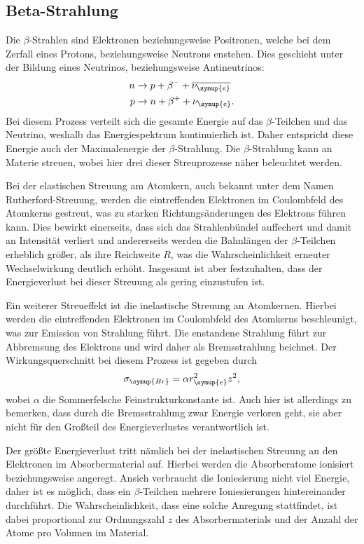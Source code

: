 \subsection{Beta-Strahlung}
Die $\beta$-Strahlen sind Elektronen beziehungsweise Positronen, welche bei dem Zerfall eines Protons, beziehungsweise Neutrons enstehen.
Dies geschieht unter der Bildung eines Neutrinos, beziehungsweise Antineutrinos:
\begin{align}
    \label{eqn:kernreaktionen}
    n &\to p + \beta^{-} + \overline{\nu_{\symup{e}}} \\
    p &\to n + \beta^{+} + \nu_{\symup{e}}. 
\end{align}     
Bei diesem Prozess verteilt sich die gesamte Energie auf das $\beta$-Teilchen und das Neutrino, weshalb das Energiespektrum kontinuierlich ist.
Daher entspricht diese Energie auch der Maximalenergie der $\beta$-Strahlung.
Die $\beta$-Strahlung kann an Materie streuen, wobei hier drei dieser Streuprozesse näher beleuchtet werden.


Bei der elastischen Streuung am Atomkern, auch bekannt unter dem Namen Rutherford-Streuung, werden die eintreffenden Elektronen 
im Coulombfeld des Atomkerns gestreut, was zu starken Richtungsänderungen des Elektrons führen kann. Dies bewirkt einerseits, dass sich das
Strahlenbündel auffechert und damit an Intensität verliert und andererseits werden die Bahnlängen der $\beta$-Teilchen erheblich größer,
als ihre Reichweite $R$, was die Wahrscheinlichkeit erneuter Wechselwirkung deutlich erhöht. Insgesamt ist aber festzuhalten, dass
der Energieverlust bei dieser Streuung als gering einzustufen ist.

Ein weiterer Streueffekt ist die inelastische Streuung an Atomkernen. Hierbei werden die eintreffenden Elektronen im Coulombfeld des Atomkerns
beschleunigt, was zur Emission von Strahlung führt. Die enstandene Strahlung führt zur Abbremsung des Elektrons und wird daher als 
Bremsstrahlung beichnet. Der Wirkungsquerschnitt bei diesem Prozess ist gegeben durch
\begin{equation}
    \label{eqn:wirkung_inelastisch}
    \sigma_{\symup{Br}} = \alpha r_{\symup{e}}^2 z^2,
\end{equation}
wobei $\alpha$ die Sommerfelsche Feinstrukturkonstante ist. Auch hier ist allerdings zu bemerken, dass durch die Bremsstrahlung zwar Energie 
verloren geht, sie aber nicht für den Großteil des Energieverlustes verantwortlich ist. 

Der größte Energieverlust tritt nämlich bei der inelastischen Streuung an den Elektronen im Absorbermaterial auf. Hierbei werden die Absorberatome 
ionisiert beziehungsweise angeregt. Ansich verbraucht die Ioniesierung nicht viel Energie, daher ist es möglich, dass ein $\beta$-Teilchen mehrere
Ioniesierungen hintereinander durchführt. Die Wahrscheinlichkeit, dass eine solche Anregung stattfindet, ist dabei proportional zur Ordnungszahl
$z$ des Absorbermaterials und der Anzahl der Atome pro Volumen im Material.

